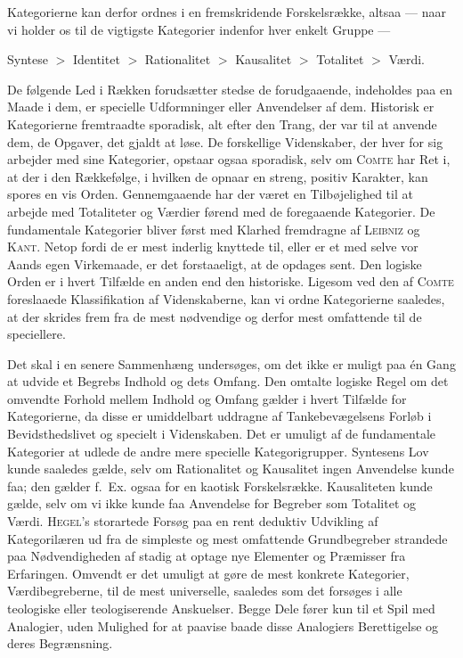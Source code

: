\documentclass[12pt]{article}
\begin{document}
Kategorierne kan derfor ordnes i en fremskridende Forskelsrække, altsaa ---
naar vi holder os til de vigtigste Kategorier indenfor hver enkelt Gruppe ---
\begin{center}
Syntese $>$ Identitet $>$ Rationalitet $>$ Kausalitet $>$ Totalitet $>$ Værdi.
\end{center}

De følgende Led i Rækken forudsætter stedse de forudgaaende, indeholdes paa
en Maade i dem, er specielle Udformninger eller Anvendelser af dem. Historisk er
Kategorierne fremtraadte sporadisk, alt efter den Trang, der var til at anvende dem,
de Opgaver, det gjaldt at løse. De forskellige Videnskaber, der hver for sig arbejder
med sine Kategorier, opstaar ogsaa sporadisk, selv om \textsc{Comte} har Ret i, at der i
den Rækkefølge, i hvilken de opnaar en streng, positiv Karakter, kan spores en vis
Orden. Gennemgaaende har der været en Tilbøjelighed til at arbejde med Totaliteter
og Værdier førend med de foregaaende Kategorier. De fundamentale Kategorier
bliver først med Klarhed fremdragne af \textsc{Leibniz} og \textsc{Kant}. Netop fordi de er mest
inderlig knyttede til, eller er et med selve vor Aands egen Virkemaade, er det
forstaaeligt, at de opdages sent. Den logiske Orden er i hvert Tilfælde en anden end
den historiske. Ligesom ved den af \textsc{Comte} foreslaaede Klassifikation af
Videnskaberne, kan vi ordne Kategorierne saaledes, at der skrides frem fra de mest
nødvendige og derfor mest omfattende til de speciellere.

Det skal i en senere Sammenhæng undersøges, om det ikke er muligt paa én
Gang at udvide et Begrebs Indhold og dets Omfang. Den omtalte logiske Regel
om det omvendte Forhold mellem Indhold og Omfang gælder i hvert Tilfælde for
Kategorierne, da disse er umiddelbart uddragne af Tankebevægelsens Forløb i
Bevidsthedslivet og specielt i Videnskaben. Det er umuligt af de fundamentale
Kategorier at udlede de andre mere specielle Kategorigrupper. Syntesens Lov kunde
saaledes gælde, selv om Rationalitet og Kausalitet ingen Anvendelse kunde faa; den
gælder f.~Ex. ogsaa for en kaotisk Forskelsrække. Kausaliteten kunde gælde, selv
om vi ikke kunde faa Anvendelse for Begreber som Totalitet og Værdi. \textsc{Hegel}'s
storartede Forsøg paa en rent deduktiv Udvikling af Kategorilæren ud fra de
simpleste og mest omfattende Grundbegreber strandede paa Nødvendigheden af stadig
at optage nye Elementer og Præmisser fra Erfaringen. Omvendt er det umuligt at
gøre de mest konkrete Kategorier, Værdibegreberne, til de mest universelle, saaledes
som det forsøges i alle teologiske eller teologiserende Anskuelser. Begge Dele fører
kun til et Spil med Analogier, uden Mulighed for at paavise baade disse Analogiers
Berettigelse og deres Begrænsning.
\end{document}
